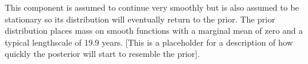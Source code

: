 This component is assumed to continue very smoothly but is also assumed to be stationary so its distribution will eventually return to the prior.
The prior distribution places mass on smooth functions with a marginal mean of zero and a typical lengthscale of 19.9 years.
[This is a placeholder for a description of how quickly the posterior will start to resemble the prior].